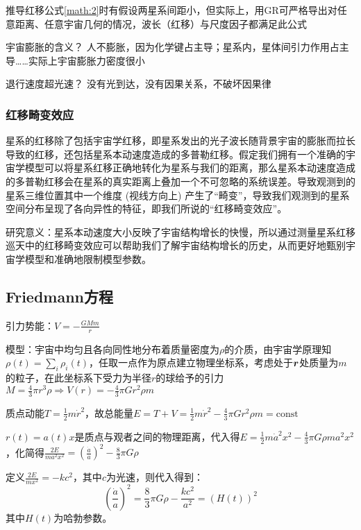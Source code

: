 \begin{cnote}
	推导红移公式\eqref{math:2}时有假设两星系间距小，但实际上，用GR可严格导出对任意距离、任意宇宙几何的情况，波长（红移）与尺度因子都满足此公式
\end{cnote}

\begin{cbox}
	{宇宙膨胀的含义？}
	人不膨胀，因为化学键占主导；星系内，星体间引力作用占主导……实际上宇宙膨胀力密度很小
\end{cbox}
\begin{cbox}
	{退行速度超光速？}
	没有光到达，没有因果关系，不破坏因果律
\end{cbox}

\subsubsection{红移畸变效应}
\par 
星系的红移除了包括宇宙学红移，即星系发出的光子波长随背景宇宙的膨胀而拉长导致的红移，还包括星系本动速度造成的多普勒红移。假定我们拥有一个准确的宇宙学模型可以将星系红移正确地转化为星系与我们的距离，那么星系本动速度造成的多普勒红移会在星系的真实距离上叠加一个不可忽略的系统误差。导致观测到的星系三维位置其中一个维度 (视线方向上) 产生了“畸变”，导致我们观测到的星系空间分布呈现了各向异性的特征，即我们所说的“红移畸变效应”。
\par 
研究意义：星系本动速度大小反映了宇宙结构增长的快慢，所以通过测量星系红移巡天中的红移畸变效应可以帮助我们了解宇宙结构增长的历史，从而更好地甄别宇宙学模型和准确地限制模型参数。



\subsection{Friedmann方程}
\par 
引力势能：$V = - \frac{G M m}{r}$
\par 
模型：宇宙中均匀且各向同性地分布着质量密度为$\rho$的介质，由宇宙学原理知$\rho(t) = \sum_i \rho_i(t)$，任取一点作为原点建立物理坐标系，考虑处于$\vb*{r}$处质量为$m$的粒子，在此坐标系下受力为半径$r$的球给予的引力$M = \frac{4}{3} \pi r^3 \rho \Rightarrow V(r) = - \frac{4}{3} \pi G r^2 \rho m$ 
\par 
质点动能$T = \frac{1}{2} m \dot{r}^2$，故总能量$E = T + V = \frac{1}{2} m \dot{r}^2 - \frac{4}{3} \pi G r^2 \rho m = \text{const}$
\par 
$r(t) = a(t) x$是质点与观者之间的物理距离，代入得$E = \frac{1}{2} m \dot{a}^2 x^2 - \frac{4}{3} \pi G \rho m a^2 x^2$，化简得$\frac{2E}{m a^2 x^2} = (\frac{\dot{a}}{a})^2 - \frac{8}{3} \pi G \rho$
\par 
定义$\frac{2 E}{m x^2} =- k c^2$，其中$c$为光速，则代入得到：
\begin{equation}
	(\frac{\dot{a}}{a})^2 = \frac{8}{3} \pi G \rho - \frac{k c^2}{a^2} = (H(t))^2
	\label{math:3}
\end{equation}
其中$H(t)$为哈勃参数。

